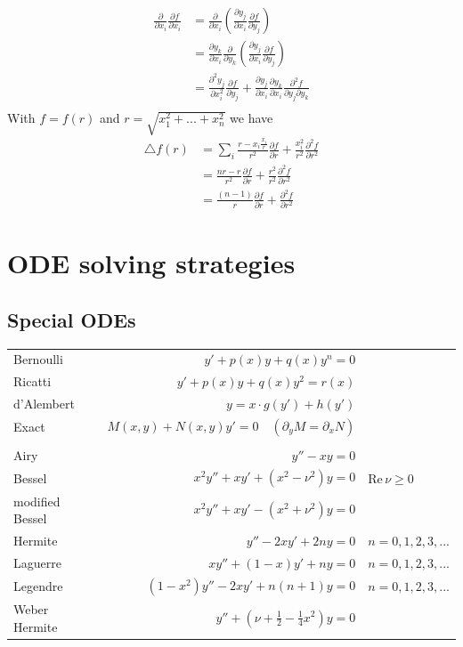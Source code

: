 \documentclass[10pt,a4paper]{book}
\theoremstyle{definition}
\begin{document}
\begin{align}
    \frac{\partial}{\partial x_i}\frac{\partial f}{\partial x_i}
    &=\frac{\partial}{\partial x_i}\left(\frac{\partial y_j}{\partial x_i}\frac{\partial f}{\partial y_j}\right)\\
    &=\frac{\partial y_k}{\partial x_i}\frac{\partial}{\partial y_k}\left(\frac{\partial y_j}{\partial x_i}\frac{\partial f}{\partial y_j}\right)\\
    &=\frac{\partial^2 y_j}{\partial x_i^2}\frac{\partial f}{\partial y_j} + \frac{\partial y_j}{\partial x_i}\frac{\partial y_k}{\partial x_i}\frac{\partial^2 f}{\partial y_j\partial y_k}\\
\end{align}
With $f=f(r)$ and $r=\sqrt{x_1^2+...+x_n^2}$ we have
\begin{align}
    \triangle f(r)
    &=\sum_i \frac{r-x_i \frac{x_i}{r}}{r^2}\frac{\partial f}{\partial r}+\frac{x_i^2}{r^2}\frac{\partial^2 f}{\partial r^2}\\
    &= \frac{nr-r}{r^2}\frac{\partial f}{\partial r}+\frac{r^2}{r^2}\frac{\partial^2 f}{\partial r^2}\\
    &= \frac{(n-1)}{r}\frac{\partial f}{\partial r}+\frac{\partial^2 f}{\partial r^2}
\end{align}

\section{ODE solving strategies}
\subsection{Special ODEs}
\begin{tabular}{lrl}
Bernoulli       & $y'+p(x)y+q(x)y^n=0$			&\\
Ricatti         & $y'+p(x)y+q(x)y^2=r(x)$		&\\
d'Alembert      & $y=x\cdot g(y')+h(y')$		&\\
Exact           & $M(x,y)+N(x,y)y'=0 \quad (\partial_yM=\partial_xN)$	&\\
                & \\
Airy            & $y''-xy=0$					&\\
Bessel          & $x^2y''+xy'+(x^2-\nu^2)y=0$	& $\text{Re}
\,\nu\ge0$\\
modified Bessel & $x^2y''+xy'-(x^2+\nu^2)y=0$	&\\
Hermite         & $y''-2xy'+2ny=0$				& $n=0,1,2,3,...$\\
Laguerre        & $xy''+(1-x)y'+ny=0$			& $n=0,1,2,3,...$\\
Legendre		& $(1-x^2)y''-2xy'+n(n+1)y=0$	& $n=0,1,2,3,...$\\
Weber Hermite   & $y''+\left(\nu+\frac{1}{2}-\frac{1}{4}x^2\right)y=0$
\end{tabular}
\end{document}
